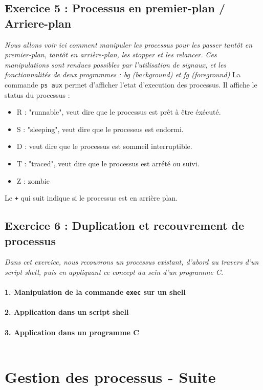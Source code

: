 \subsection{Exercice 5 : Processus en premier-plan / Arriere-plan}
\textit{Nous allons voir ici comment manipuler les processus pour les passer tantôt en premier-plan, tantôt en arrière-plan, les stopper et les relancer. Ces manipulations sont rendues possibles par l’utilisation de signaux, et les fonctionnalités de deux programmes : bg (background) et fg (foreground)}
La commande \texttt{ps aux} permet d'afficher l'etat d'execution des processus.
Il affiche le status du processus :
\begin{itemize}
\item R : "runnable", veut dire que le processus est prêt à être éxécuté.
\item S : "sleeping", veut dire que le processus est endormi.
\item D : veut dire que le processus est sommeil interruptible.
\item T : "traced", veut dire que le processus est arrété ou suivi.
\item Z : zombie
\end{itemize}
Le \texttt{+} qui suit indique si le processus est en arrière plan.

\subsection{Exercice 6 : Duplication et recouvrement de processus}
\textit{Dans cet exercice, nous recouvrons un processus existant, d’abord au travers d’un script shell, puis en appliquant ce concept au sein d’un programme C.}
\paragraph{1. Manipulation de la commande \texttt{exec} sur un shell}
\paragraph{2. Application dans un script shell}
\paragraph{3. Application dans un programme C}
\inputminted[linenos,firstline=8, lastline=23]{cpp}{../sources/cpp/TP5-6/ex6.c}

\section{Gestion des processus - Suite}
